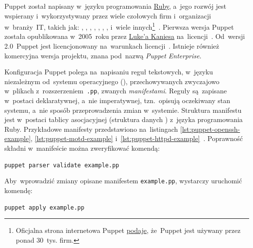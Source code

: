 \documentclass[thesis]{subfiles}
\begin{document}
Puppet został napisany w~języku programowania \href{https://en.wikipedia.org/wiki/Ruby_(programming_language)}{Ruby}, a~jego rozwój jest wspierany i~wykorzystywany przez wiele czołowych firm i~organizacji w~branży~IT, takich jak: , , , , , , ,  i~wiele innych\footnote{Oficjalna strona internetowa Puppet \href{https://puppet.com/company/leadership/luke-kanies}{podaje}, że~Puppet jest używany przez ponad 30~tys. firm.}~\cite{puppet,puppet-google,puppet-cern,puppet-chef-disney}. Pierwsza wersja Puppet została opublikowana w~2005~roku przez \href{https://puppet.com/company/leadership/luke-kanies}{Luke'a Kaniesa} na~licencji~. Od~wersji 2.0~Puppet jest licencjonowany na~warunkach licencji~. Istnieje również komercyjna wersja projektu, znana pod~nazwą \emph{Puppet Enterprise}.

Konfiguracja Puppet polega na~napisaniu reguł tekstowych, w~języku niezależnym od~systemu operacyjnego (), przechowywanych zwyczajowo w~plikach z~rozszerzeniem~\texttt{.pp}, zwanych \emph{manifestami}. Reguły są~zapisane w~postaci deklaratywnej, a~nie imperatywnej, tzn.~opisują oczekiwany stan systemu, a~nie sposób przeprowadzenia zmian w~systemie. Struktura manifestu jest w~postaci tablicy asocjacyjnej (struktura danych ) z~języka programowania Ruby. Przykładowe manifesty przedstawiono na~listingach \ref{lst:puppet-openssh-example}, \ref{lst:puppet-motd-example} i~\ref{lst:puppet-httpd-example}~\cite{puppet-examples}. Poprawność składni w~manifeście  można zweryfikować komendą:\mynobreakpar
\begin{center}
	\texttt{puppet parser validate example.pp}
\end{center}

Aby~wprowadzić zmiany opisane manifestem \texttt{example.pp}, wystarczy uruchomić komendę:\mynobreakpar
\begin{center}
	\texttt{puppet apply example.pp}
\end{center}
\end{document}
